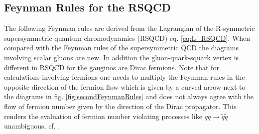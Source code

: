 \subsection{Feynman Rules for the RSQCD}\label{sec:FeynmanRules}
The following Feynman rules are derived from the Lagrangian of the R-symmetric supersymmetric quantum chromodynamics (RSQCD) eq. \ref{eq:L_RSQCD}. When compared with the Feynman rules of the supersymmetric QCD the diagrams involving scalar gluons are new. In addition the gluon-quark-squark vertex is different in RSQCD for the gauginos are Dirac fermions. Note that for calculations involving fermions one needs to multiply the Feynman rules in the opposite direction of the fermion flow which is given by a curved arrow next to the diagrams in fig. \ref{fig:secondFeynmanRules} and does not always agree with the flow of fermion number given by the direction of the Dirac propagator. This renders the evaluation of fermion number violating processes like $qq \to \tilde{q}\tilde{q}$ unambiguous, cf. \cite{Beenakker:1996ch}.
